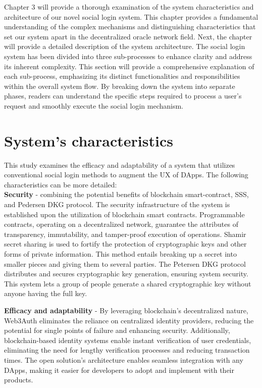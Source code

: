 \documentclass[../Main.tex]{subfiles}
\begin{document}
Chapter 3 will provide a thorough examination of the system characteristics and architecture of our novel social login system. This chapter provides a fundamental understanding of the complex mechanisms and distinguishing characteristics that set our system apart in the decentralized oracle network field. Next, the chapter will provide a detailed description of the system architecture. The social login system has been divided into three sub-processes to enhance clarity and address its inherent complexity. This section will provide a comprehensive explanation of each sub-process, emphasizing its distinct functionalities and responsibilities within the overall system flow. By breaking down the system into separate phases, readers can understand the specific steps required to process a user's request and smoothly execute the social login mechanism.
\section{System's characteristics}
This study examines the efficacy and adaptability of a system that utilizes conventional social login methods to augment the UX of DApps. The following characteristics can be more detailed: \\
\indent\textbf{Security} - combining the potential benefits of blockchain smart-contract, SSS, and Pedersen DKG protocol. The security infrastructure of the system is established upon the utilization of blockchain smart contracts. Programmable contracts, operating on a decentralized network, guarantee the attributes of transparency, immutability, and tamper-proof execution of operations. Shamir secret sharing is used to fortify the protection of cryptographic keys and other forms of private information. This method entails breaking up a secret into smaller pieces and giving them to several parties. The Petersen DKG protocol distributes and secures cryptographic key generation, ensuring system security. This system lets a group of people generate a shared cryptographic key without anyone having the full key. 

\indent\textbf{Efficacy and adaptability} - By leveraging blockchain's decentralized nature, Web3Auth eliminates the reliance on centralized identity providers, reducing the potential for single points of failure and enhancing security. Additionally, blockchain-based identity systems enable instant verification of user credentials, eliminating the need for lengthy verification processes and reducing transaction times. The open solution's architecture enables seamless integration with any DApps, making it easier for developers to adopt and implement with their products. 
\end{document}
